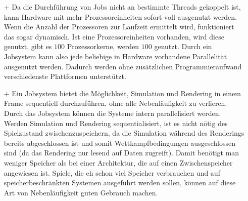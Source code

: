 \begin{itemize}
	\item[$+$]  Da die Durchführung von Jobs nicht an bestimmte Threads gekoppelt ist, kann Hardware mit mehr Prozessoreinheiten sofort voll ausgenutzt werden. Wenn die Anzahl der Prozessoren zur Laufzeit ermittelt wird, funktioniert das sogar dynamisch. Ist eine Prozessoreinheiten vorhanden, wird diese genutzt, gibt es $100$ Prozessorkerne, werden $100$ genutzt. Durch ein Jobsystem kann also jede beliebige in Hardware vorhandene Parallelität ausgenutzt werden. Dadurch werden ohne zusätzlichen Programmieraufwand verschiedenste Plattformen unterstützt.
	\item[$+$] Ein Jobsystem bietet die Möglichkeit, Simulation und Rendering in einem Frame sequentiell durchzuführen, ohne alle Nebenläufigkeit zu verlieren. Durch das Jobsystem können die Systeme intern parallelisiert werden. Werden Simulation und Rendering sequentialisiert, ist es nicht nötig des Spielzustand zwischenzuspeichern, da die Simulation während des Renderings bereits abgeschlossen ist und somit Wettkampfbedingungen ausgeschlossen sind (da das Rendering nur lesend auf Daten zugreift). Damit benötigt man weniger Speicher als bei einer Architektur, die auf einen Zwischenspeicher angewiesen ist. Spiele, die eh schon viel Speicher verbrauchen und auf speicherbeschränkten Systemen ausgeführt werden sollen, können auf diese Art von Nebenläufigkeit guten Gebrauch machen. 
	

\end{itemize}
